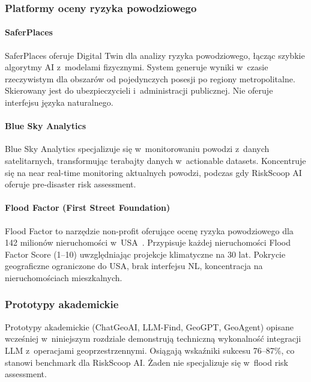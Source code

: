 \subsubsection{Platformy oceny ryzyka powodziowego}

\paragraph{SaferPlaces}

SaferPlaces oferuje Digital Twin dla analizy ryzyka powodziowego, łącząc szybkie algorytmy AI z~modelami fizycznymi. System generuje wyniki w~czasie rzeczywistym dla obszarów od pojedynczych posesji po regiony metropolitalne. Skierowany jest do ubezpieczycieli i~administracji publicznej. Nie oferuje interfejsu języka naturalnego.

\paragraph{Blue Sky Analytics}

Blue Sky Analytics specjalizuje się w~monitorowaniu powodzi z~danych satelitarnych, transformując terabajty danych w~actionable datasets. Koncentruje się na near real-time monitoring aktualnych powodzi, podczas gdy RiskScoop AI oferuje pre-disaster risk assessment.

\paragraph{Flood Factor (First Street Foundation)}

Flood Factor to narzędzie non-profit oferujące ocenę ryzyka powodziowego dla 142 milionów nieruchomości w~USA~\cite{firststreet2020flood}. Przypisuje każdej nieruchomości Flood Factor Score (1--10) uwzględniając projekcje klimatyczne na 30 lat. Pokrycie geograficzne ograniczone do USA, brak interfejsu NL, koncentracja na nieruchomościach mieszkalnych.

\subsubsection{Prototypy akademickie}

Prototypy akademickie (ChatGeoAI, LLM-Find, GeoGPT, GeoAgent) opisane wcześniej w~niniejszym rozdziale demonstrują techniczną wykonalność integracji LLM z~operacjami geoprzestrzennymi. Osiągają wskaźniki sukcesu 76--87\%, co stanowi benchmark dla RiskScoop AI. Żaden nie specjalizuje się w~flood risk assessment.

